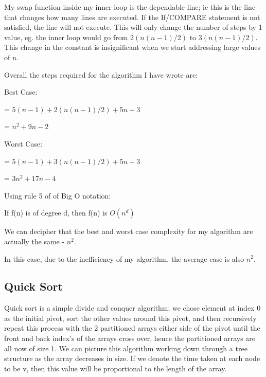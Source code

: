 \documentclass{article}
\begin{document}
My swap function inside my inner loop is the dependable line; ie this is the line that changes how many lines are executed. If the If/COMPARE statement is not satisfied, the line will not execute. This will only change the number of steps by 1 value, eg. the inner loop would go from $2(n(n - 1) / 2)$ to $3(n(n - 1) / 2)$. This change in the constant is insignificant when we start addressing large values of n.\par

Overall the steps required for the algorithm I have wrote are:\newline


Best Case:\newline

= $5(n - 1) + 2(n(n - 1) / 2) + 5n + 3$\newline

= $n^2 + 9n - 2$\newline


Worst Case:\newline

= $5(n - 1) + 3(n(n - 1) / 2) + 5n + 3$\newline

= $3n^2 + 17n - 4$\newline




Using rule 5 of of Big O notation:\newline

If f(n) is of degree d, then f(n) is $O(n^d)$\newline

We can decipher that the best and worst case complexity for my algorithm are actually the same - $n^2$.\newline

In this case, due to the inefficiency of my algorithm, the average case is also $n^2$.\newline



\subsection{Quick Sort}

Quick sort is a simple divide and conquer algorithm; we chose element at index 0 as the initial pivot, sort the other values around this pivot, and then recursively repeat this process with the 2 partitioned arrays either side of the pivot until the front and back index's of the arrays cross over, hence the partitioned arrays are all now of size 1. We can picture this algorithm working down through a tree structure as the array decreases in size. If we denote the time taken at each node to be v, then this value will be proportional to the length of the array.\par
\end{document}
